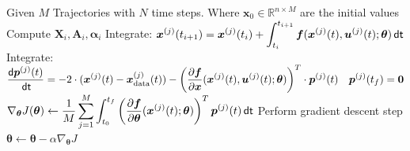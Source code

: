 \documentclass[a4paper, 12pt]{scrartcl}
\newcommand{\dt}{\thinspace \mathsf{dt}}
\begin{document}
\begin{algorithm}\label{alg:MLP_Adjoint}
    \caption{Training of a MLP Neural ODE with Adjoint Approach}
    \begin{algorithmic}[1]
        \State Given $M$ Trajectories with $N$ time steps. 
        Where $\bm{x}_0 \in \mathbb{R}^{n \times M}$ are the initial values 
                \State Compute $\bm{X}_i, \bm{A}_i, \bm{\alpha}_i$
                \State Integrate:
                $\begin{aligned}
                    \bm{x}^{(j)}(t_{i+1})
                    = 
                    \bm{x}^{(j)}(t_{i})
                    +
                    \int_{t_i}^{t_{i+1}}
                    \bm{f}(\bm{x}^{(j)}(t), \bm{u}^{(j)}(t); \bm{\theta}) \dt
                \end{aligned}$
            \EndFor
            \State Integrate:
            $\begin{aligned}
                \frac{\mathsf{d}\bm{p}^{(j)}(t)}{\dt}
                = 
                -2 \cdot (\bm{x}^{(j)}(t) - \bm{x}^{(j)}_{\text{data}}(t)) 
                - \left(
                    \frac{\partial \bm{f}}{\partial \bm{x}}(\bm{x}^{(j)}(t), \bm{u}^{(j)}(t); \bm{\theta}) 
                \right)^T 
                \cdot 
                \bm{p}^{(j)}(t)
                \quad
                \bm{p}^{(j)}(t_f) = \bm{0}
            \end{aligned}$
            \State 
            $\begin{aligned}
                \nabla_{\bm{\theta}} J(\bm{\theta}) 
                \leftarrow
                \frac{1}{M} 
                \sum_{j=1}^{M}
                \int_{t_0}^{t_f} 
                \left(
                    \frac{\partial \bm{f}}{\partial \bm{\theta}}
                    (\bm{x}^{(j)}(t); \bm{\theta})
                \right)^T \bm{p}^{(j)}(t) \dt 
            \end{aligned}$
            \State Perform gradient descent step 
            $\bm{\theta} \leftarrow \bm{\theta} - \alpha \nabla_{\bm{\theta}} J$ 
        \EndFor
    \end{algorithmic}
\end{algorithm}
\end{document}
